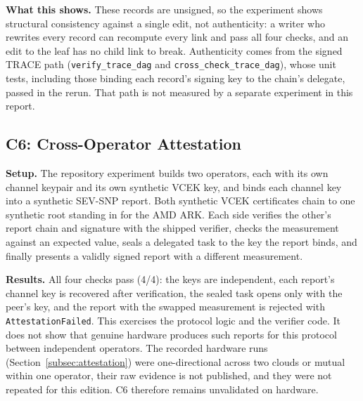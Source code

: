 \textbf{What this shows.} These records are unsigned, so the experiment shows structural
consistency against a single edit, not authenticity: a writer who rewrites every record can
recompute every link and pass all four checks, and an edit to the leaf has no child link to
break. Authenticity comes from the signed TRACE path (\texttt{verify\_trace\_dag} and
\texttt{cross\_check\_trace\_dag}), whose unit tests, including those binding each record's
signing key to the chain's delegate, passed in the rerun. That path is not measured by a separate
experiment in this report.

\subsection{C6: Cross-Operator Attestation}
\label{sec:eval-c6}

\textbf{Setup.} The repository experiment builds two operators, each with its own channel keypair
and its own synthetic VCEK key, and binds each channel key into a synthetic SEV-SNP report. Both
synthetic VCEK certificates chain to one synthetic root standing in for the AMD ARK. Each side
verifies the other's report chain and signature with the shipped verifier, checks the
measurement against an expected value, seals a delegated task to the key the report binds, and
finally presents a validly signed report with a different measurement.

\textbf{Results.} All four checks pass (4/4): the keys are independent, each report's channel key
is recovered after verification, the sealed task opens only with the peer's key, and the report
with the swapped measurement is rejected with \texttt{AttestationFailed}. This exercises the
protocol logic and the verifier code. It does not show that genuine hardware produces such
reports for this protocol between independent operators. The recorded hardware runs
(Section~\ref{subsec:attestation}) were one-directional across two clouds or mutual within one
operator, their raw evidence is not published, and they were not repeated for this edition. C6
therefore remains unvalidated on hardware.
